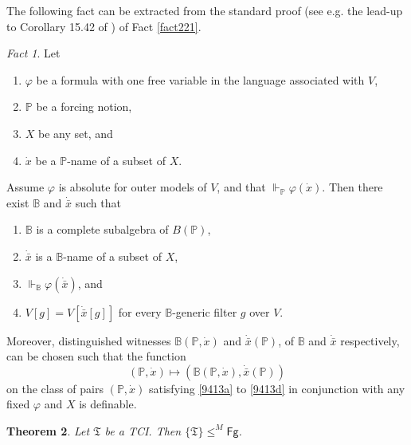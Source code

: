 \documentclass[12pt, twoside]{memoir}
\numberwithin{equation}{section}
\newtheorem{thm}{Theorem}[section]
\theoremstyle{definition}
\theoremstyle{remark}
\newtheorem{fact}[thm]{Fact}
\theoremstyle{definition}
\theoremstyle{definition}
\theoremstyle{definition}
\theoremstyle{remark}
\begin{document}
The following fact can be extracted from the standard proof (see e.g. the lead-up to Corollary 15.42 of \cite{jech}) of Fact \ref{fact221}.

\begin{fact}\label{fact9413}
Let
\begin{enumerate}[label=(\alph*)]
    \item\label{9413a} $\varphi$ be a formula with one free variable in the language associated with $V$,
    \item $\mathbb{P}$ be a forcing notion, 
    \item $X$ be any set, and
    \item\label{9413d} $\dot{x}$ be a $\mathbb{P}$-name of a subset of $X$.
\end{enumerate}
Assume $\varphi$ is absolute for outer models of $V$, and that $\Vdash_{\mathbb{P}} \varphi(\dot{x})$. Then there exist $\mathbb{B}$ and $\dot{\bar{x}}$ such that
\begin{enumerate}[label=(\arabic*)]
    \item $\mathbb{B}$ is a complete subalgebra of $B(\mathbb{P})$, 
    \item $\dot{\bar{x}}$ is a $\mathbb{B}$-name of a subset of $X$, 
    \item $\Vdash_{\mathbb{B}} \varphi(\dot{\bar{x}})$, and
    \item $V[g] = V[\dot{\bar{x}}[g]]$ for every $\mathbb{B}$-generic filter $g$ over $V$.
\end{enumerate}
Moreover, distinguished witnesses $\mathbb{B}(\mathbb{P}, \dot{x})$ and $\dot{\bar{x}}(\mathbb{P})$, of $\mathbb{B}$ and $\dot{\bar{x}}$ respectively, can be chosen such that the function 
\begin{equation*}
    (\mathbb{P}, \dot{x}) \mapsto (\mathbb{B}(\mathbb{P}, \dot{x}), \dot{\bar{x}}(\mathbb{P}))
\end{equation*}
on the class of pairs $(\mathbb{P}, \dot{x})$ satisfying \ref{9413a} to \ref{9413d} in conjunction with any fixed $\varphi$ and $X$ is definable.
\end{fact}

\begin{thm}\label{thm9414}
Let $\mathfrak{T}$ be a TCI. Then $\{\mathfrak{T}\} \leq^M \mathsf{Fg}$.
\end{thm}
\end{document}
